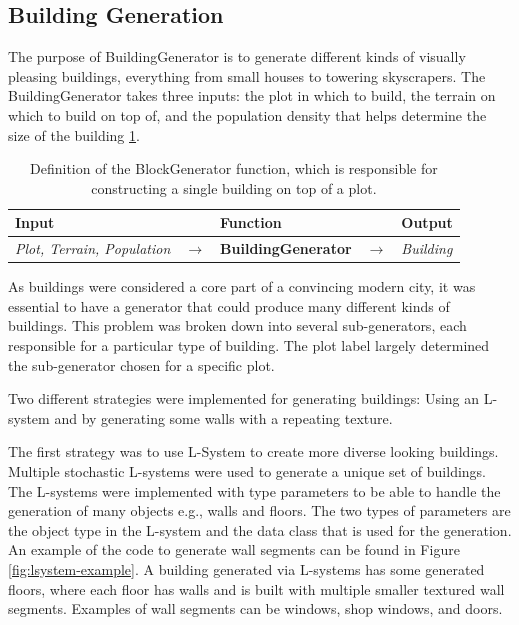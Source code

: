 \subsection{Building Generation}
The purpose of BuildingGenerator is to generate different kinds of visually pleasing buildings, everything from small houses to towering skyscrapers. 
The BuildingGenerator takes three inputs: the plot in which to build, the terrain on which to build on top of, and the population density that helps determine the size of the building \ref{table:buildinggen}.

\begin{table}[H]
  \centering
  \begin{tabular}{lllll}
    \textbf{Input}                           &               & \textbf{Function}            &               & \textbf{Output}         \\
    \midrule
    \textit{Plot, Terrain, Population}       & $\rightarrow$ & \textbf{BuildingGenerator}   & $\rightarrow$ & \textit{Building}       \\
    \bottomrule
  \end{tabular}
  
  \caption{Definition of the BlockGenerator function, which is responsible for constructing a single building on top of a plot.}
  \label{table:buildinggen}
\end{table}
\vspace{-0.4cm} 

As buildings were considered a core part of a convincing modern city, it was essential to have a generator that could produce many different kinds of buildings. 
This problem was broken down into several sub-generators, each responsible for a particular type of building.
The plot label largely determined the sub-generator chosen for a specific plot.

Two different strategies were implemented for generating buildings: Using an L-system and by generating some walls with a repeating texture.

The first strategy was to use L-System to create more diverse looking buildings.
Multiple stochastic L-systems were used to generate a unique set of buildings. 
The L-systems were implemented with type parameters to be able to handle the generation of many objects e.g., walls and floors.
The two types of parameters are the object type in the L-system and the data class that is used for the generation.
An example of the code to generate wall segments can be found in Figure \ref{fig:lsystem-example}. 
A building generated via L-systems has some generated floors, where each floor has walls and is built with multiple smaller textured wall segments. 
Examples of wall segments can be windows, shop windows, and doors.

